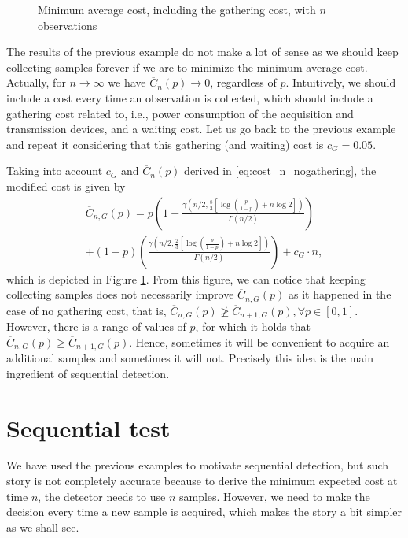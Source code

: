 \begin{figure}[t]
	\begin{center}
		
	\end{center}
	\caption{Minimum average cost, including the gathering cost, with $n$ observations}
	\label{fig:average_cost2_n}
\end{figure}

The results of the previous example do not make a lot of sense as we should keep collecting samples forever if we are to minimize the minimum average cost. Actually, for $n \rightarrow \infty$ we have $\overline{C}_n(p) \rightarrow 0$, regardless of $p$. Intuitively, we should include a cost every time an observation is collected, which should include a gathering cost related to, i.e., power consumption of the acquisition and transmission devices, and a waiting cost. Let us go back to the previous example and repeat it considering that this gathering (and waiting) cost is $c_{G} = 0.05$.

Taking into account $c_{G}$ and $\overline{C}_n(p)$ derived in \eqref{eq:cost_n_nogathering}, the modified cost is given by
\begin{multline*}
	\overline{C}_{n,G}(p)  = p \left(1 - \frac{\gamma \left(n/2,\frac{8}{3} \left[\log \left(\frac{p}{1 - p}  \right) + n \log 2 \right]\right)}{\Gamma(n/2)}\right) \\ + (1 - p) \left(\frac{\gamma \left(n/2,\frac{2}{3} \left[\log \left(\frac{p}{1 - p}  \right) + n \log 2 \right]\right)}{\Gamma(n/2)}\right) + c_G \cdot n,
\end{multline*}
which is depicted in Figure \ref{fig:average_cost2_n}. From this figure, we can notice that keeping collecting samples does not necessarily improve $\overline{C}_{n,G}(p)$ as it happened in the case of no gathering cost, that is, $\overline{C}_{n,G}(p) \not \geq \overline{C}_{n+1,G}(p), \forall p \in [0,1]$. However, there is a range of values of $p$, for which it holds that $\overline{C}_{n,G}(p) \geq \overline{C}_{n+1,G}(p)$. Hence, sometimes it will be convenient to acquire an additional samples and sometimes it will not. Precisely this idea is the main ingredient of sequential detection.

\section{Sequential test}

We have used the previous examples to motivate sequential detection, but such story is not completely accurate because to derive the minimum expected cost at time $n$, the detector needs to use $n$ samples. However, we need to make the decision every time a new sample is acquired, which makes the story a bit simpler as we shall see.

